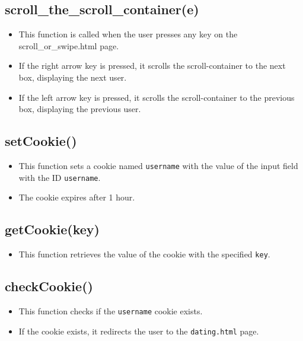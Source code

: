 \documentclass[12pt,a4paper]{article}
\begin{document}
\subsection{scroll\_the\_scroll\_container(e)}
\begin{itemize}
    \item This function is called when the user presses any key on the scroll\_or\_swipe.html page.
    \item If the right arrow key is pressed, it scrolls the scroll-container to the next box, displaying the next user.
    \item If the left arrow key is pressed, it scrolls the scroll-container to the previous box, displaying the previous user.
\end{itemize}

\subsection{setCookie()}
\begin{itemize}
    \item This function sets a cookie named \texttt{username} with the value of the input field with the ID \texttt{username}.
    \item The cookie expires after 1 hour.
\end{itemize}

\subsection{getCookie(key)}
\begin{itemize}
    \item This function retrieves the value of the cookie with the specified \texttt{key}.
\end{itemize}

\subsection{checkCookie()}
\begin{itemize}
    \item This function checks if the \texttt{username} cookie exists.
    \item If the cookie exists, it redirects the user to the \texttt{dating.html} page.
\end{itemize}
\end{document}
